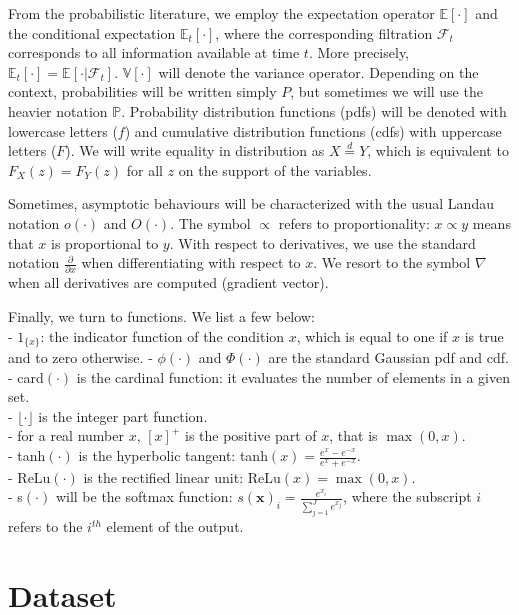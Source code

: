 \documentclass[]{krantz}
\theoremstyle{definition}
\theoremstyle{definition}
\theoremstyle{definition}
\theoremstyle{remark}
\begin{document}
From the probabilistic literature, we employ the expectation operator
\(\mathbb{E}[\cdot]\) and the conditional expectation
\(\mathbb{E}_t[\cdot]\), where the corresponding filtration
\(\mathcal{F}_t\) corresponds to all information available at time
\(t\). More precisely,
\(\mathbb{E}_t[\cdot]=\mathbb{E}[\cdot | \mathcal{F}_t]\).
\(\mathbb{V}[\cdot]\) will denote the variance operator. Depending on
the context, probabilities will be written simply \(P\), but sometimes
we will use the heavier notation \(\mathbb{P}\). Probability
distribution functions (pdfs) will be denoted with lowercase letters
(\(f\)) and cumulative distribution functions (cdfs) with uppercase
letters (\(F\)). We will write equality in distribution as
\(X \overset{d}{=}Y\), which is equivalent to \(F_X(z)=F_Y(z)\) for all
\(z\) on the support of the variables.

Sometimes, asymptotic behaviours will be characterized with the usual
Landau notation \(o(\cdot)\) and \(O(\cdot)\). The symbol \(\propto\)
refers to proportionality: \(x\propto y\) means that \(x\) is
proportional to \(y\). With respect to derivatives, we use the standard
notation \(\frac{\partial}{\partial x}\) when differentiating with
respect to \(x\). We resort to the symbol \(\nabla\) when all
derivatives are computed (gradient vector).

Finally, we turn to functions. We list a few below:\\
- \(1_{\{x \}}\): the indicator function of the condition \(x\), which
is equal to one if \(x\) is true and to zero otherwise. -
\(\phi(\cdot)\) and \(\Phi(\cdot)\) are the standard Gaussian pdf and
cdf.\\
- card\((\cdot)\) is the cardinal function: it evaluates the number of
elements in a given set.\\
- \(\lfloor \cdot \rfloor\) is the integer part function.\\
- for a real number \(x\), \([x]^+\) is the positive part of \(x\), that
is \(\max(0,x)\).\\
- tanh\((\cdot)\) is the hyperbolic tangent:
tanh\((x)=\frac{e^x-e^{-x}}{e^x+e^{-x}}\).\\
- ReLu\((\cdot)\) is the rectified linear unit: ReLu\((x)=\max(0,x)\).\\
- s\((\cdot)\) will be the softmax function:
\(s(\textbf{x})_i=\frac{e^{x_i}}{\sum_{j=1}^Je^{x_j}}\), where the
subscript \(i\) refers to the \(i^{th}\) element of the output.

\hypertarget{dataset}{%
\section{Dataset}\label{dataset}}
\end{document}
